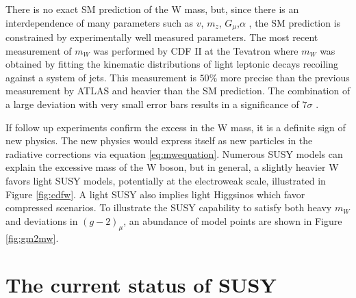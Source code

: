 There is no exact SM prediction of the W mass, but, since there is an interdependence of many parameters such as $v$, $m_z$, $G_\mu$,$\alpha$ , the SM prediction is constrained by experimentally well measured parameters. The most recent measurement of $m_W$ was performed by CDF II at the Tevatron where $m_W$ was obtained by fitting the kinematic distributions of light leptonic decays recoiling against a system of jets. This measurement is $50\%$ more precise than the previous measurement by ATLAS and heavier than the SM prediction. The combination of a large deviation with very small error bars results in a significance of $7\sigma$ \cite{CDF:2022hxs}.  

If follow up experiments confirm the excess in the W mass, it is a definite sign of new physics. The new physics would express itself as new particles in the radiative corrections via equation \ref{eq:mwequation}. Numerous SUSY models can explain the excessive mass of the W boson, but in general, a slightly heavier W favors light SUSY models, potentially at the electroweak scale, illustrated in Figure \ref{fig:cdfw}. A light SUSY also implies light Higgsinos which favor compressed scenarios.  To illustrate the SUSY capability to satisfy both heavy $m_W$ and deviations in $(g-2)_\mu$, an abundance of model points are shown in Figure \ref{fig:gm2mw}.
\section{The current status of SUSY}

